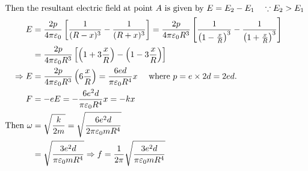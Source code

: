 \begin{enumerate}
\begin{answer}
\begin{align*}
\intertext{	Then the resultant electric field at point $A$ is given by $E=E_{2}-E_{1} \quad \because E_{2}>E_{1}$}
	E&=\frac{2 p}{4 \pi \varepsilon_{0}}\left[\frac{1}{(R-x)^{3}}-\frac{1}{(R+x)^{3}}\right]=\frac{2 p}{4 \pi \varepsilon_{0} R^{3}}\left[\frac{1}{\left(1-\frac{x}{R}\right)^{3}}-\frac{1}{\left(1+\frac{x}{R}\right)^{3}}\right]\\&=\frac{2 p}{4 \pi \varepsilon_{0} R^{3}}\left[\left(1+3 \frac{x}{R}\right)-\left(1-3 \frac{x}{R}\right)\right] \\
	\Rightarrow E&=\frac{2 p}{4 \pi \varepsilon_{0} R^{3}}\left(6 \frac{x}{R}\right)=\frac{6 e d}{\pi \varepsilon_{0} R^{4}} x \quad \text { where } p=e \times 2 d=2 e d . \\
	F&=-e E=-\frac{6 e^{2} d}{\pi \varepsilon_{0} R^{4}} x=-k x\\
\text{	Then }\omega&=\sqrt{\frac{k}{2 m}}=\sqrt{\frac{6 e^{2} d}{2 \pi \varepsilon_{0} m R^{4}}}\\&=\sqrt{\frac{3 e^{2} d}{\pi \varepsilon_{0} m R^{4}}} \Rightarrow f=\frac{1}{2 \pi} \sqrt{\frac{3 e^{2} d}{\pi \varepsilon_{0} m R^{4}}}
	\end{align*}
\end{answer}
\end{enumerate}